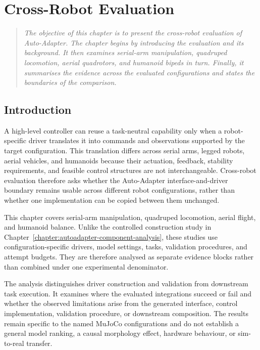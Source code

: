 \chapter[Cross-Robot Evaluation]{Cross-Robot Evaluation}
\label{chapter:cross-robot-evaluation}

\begin{quote}\itshape
The objective of this chapter is to present the cross-robot evaluation of
Auto-Adapter. The chapter begins by introducing the evaluation and its
background. It then examines serial-arm manipulation, quadruped locomotion,
aerial quadrotors, and humanoid bipeds in turn. Finally, it summarises the
evidence across the evaluated configurations and states the boundaries of the
comparison.
\end{quote}

\section[Introduction]{Introduction}
\label{sec:cross-robot-introduction}

A high-level controller can reuse a task-neutral capability only when a
robot-specific driver translates it into commands and observations supported
by the target configuration. This translation differs across serial arms,
legged robots, aerial vehicles, and humanoids because their actuation,
feedback, stability requirements, and feasible control structures are not
interchangeable. Cross-robot evaluation therefore asks whether the
Auto-Adapter interface-and-driver boundary remains usable across different
robot configurations, rather than whether one implementation can be copied
between them unchanged.

This chapter covers serial-arm
manipulation, quadruped locomotion, aerial flight, and humanoid balance. Unlike
the controlled construction study in
Chapter~\ref{chapter:autoadapter-component-analysis}, these studies use
configuration-specific drivers, model settings, tasks, validation procedures,
and attempt budgets. They are therefore analysed as separate evidence blocks
rather than combined under one experimental denominator.

The analysis distinguishes driver construction and validation from downstream
task execution. It examines where the evaluated integrations succeed or fail
and whether the observed limitations arise from the generated interface,
control implementation, validation procedure, or downstream composition. The
results remain specific to the named MuJoCo configurations and do not establish
a general model ranking, a causal morphology effect, hardware behaviour, or
sim-to-real transfer.


